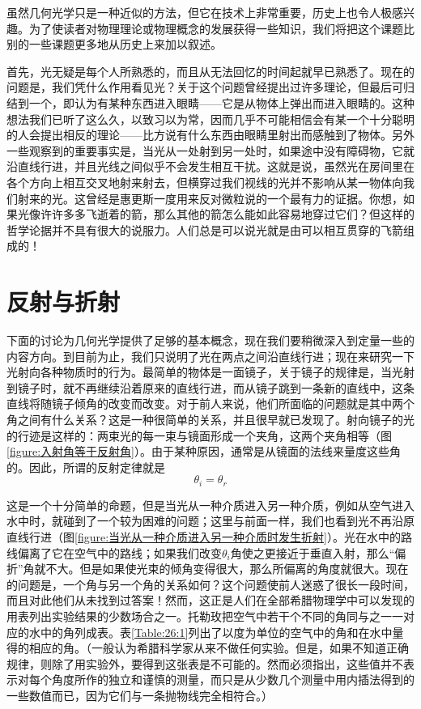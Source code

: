 虽然几何光学只是一种近似的方法，但它在技术上非常重要，历史上也令人极感兴趣。为了使读者对物理理论或物理概念的发展获得一些知识，我们将把这个课题比别的一些课题更多地从历史上来加以叙述。

首先，光无疑是每个人所熟悉的，而且从无法回忆的时间起就早已熟悉了。现在的问题是，我们凭什么作用看见光？关于这个问题曾经提出过许多理论，但最后可归结到一个，即认为有某种东西进入眼睛——它是从物体上弹出而进入眼睛的。这种想法我们已听了这么久，以致习以为常，因而几乎不可能相信会有某一个十分聪明的人会提出相反的理论——比方说有什么东西由眼睛里射出而感触到了物体。另外一些观察到的重要事实是，当光从一处射到另一处时，如果途中没有障碍物，它就沿直线行进，并且光线之间似乎不会发生相互干扰。这就是说，虽然光在房间里在各个方向上相互交叉地射来射去，但横穿过我们视线的光并不影响从某一物体向我们射来的光。这曾经是惠更斯一度用来反对微粒说的一个最有力的证据。你想，如果光像许许多多飞逝着的箭，那么其他的箭怎么能如此容易地穿过它们？但这样的哲学论据并不具有很大的说服力。人们总是可以说光就是由可以相互贯穿的飞箭组成的！

\section{反射与折射}

下面的讨论为几何光学提供了足够的基本概念，现在我们要稍微深入到定量一些的内容方向。到目前为止，我们只说明了光在两点之间沿直线行进；现在来研究一下光射向各种物质时的行为。最简单的物体是一面镜子，关于镜子的规律是，当光射到镜子时，就不再继续沿着原来的直线行进，而从镜子跳到一条新的直线中，这条直线将随镜子倾角的改变而改变。对于前人来说，他们所面临的问题就是其中两个角之间有什么关系？这是一种很简单的关系，并且很早就已发现了。射向镜子的光的行迹是这样的：两束光的每一束与镜面形成一个夹角，这两个夹角相等（图\ref{figure:入射角等于反射角}）。由于某种原因，通常是从镜面的法线来量度这些角的。因此，所谓的反射定律就是
\begin{equation}
    \label{Eq:I:26:1}
    \theta_i = \theta_r
\end{equation}

这是一个十分简单的命题，但是当光从一种介质进入另一种介质，例如从空气进入水中时，就碰到了一个较为困难的问题；这里与前面一样，我们也看到光不再沿原直线行进（图\ref{figure:当光从一种介质进入另一种介质时发生折射}）。光在水中的路线偏离了它在空气中的路线；如果我们改变$\theta_i$角使之更接近于垂直入射，那么“偏折”角就不大。但是如果使光束的倾角变得很大，那么所偏离的角度就很大。现在的问题是，一个角与另一个角的关系如何？这个问题使前人迷惑了很长一段时间，而且对此他们从未找到过答案！然而，这正是人们在全部希腊物理学中可以发现的用表列出实验结果的少数场合之一。托勒玫把空气中若干个不同的角同与之一一对应的水中的角列成表。表\ref{Table:26:1}列出了以度为单位的空气中的角和在水中量得的相应的角。（一般认为希腊科学家从来不做任何实验。但是，如果不知道正确规律，则除了用实验外，要得到这张表是不可能的。然而必须指出，这些值并不表示对每个角度所作的独立和谨慎的测量，而只是从少数几个测量中用内插法得到的一些数值而已，因为它们与一条抛物线完全相符合。）


